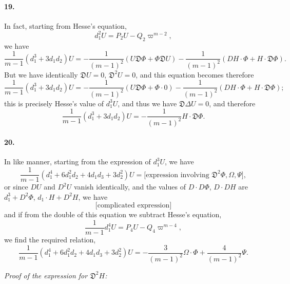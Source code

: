 \documentclass[12pt,a4paper]{article}
\theoremstyle{plain}
\begin{document}
\paragraph{19.}
In  fact,  starting  from  Hesse's  equation,
\[
d_1^2 U = P_2 U - Q_2 \varpi^{m-2},
\]
we   have
\[
\frac{1}{m-1}(d_1^3 + 3d_1 d_2)U = -\frac{1}{(m-1)^2}(U \mathfrak{D} \Phi + \Phi \mathfrak{D} U) - \frac{1}{(m-1)^2}(DH \cdot \Phi + H \cdot \mathfrak{D} \Phi).
\]
But  we  have  identically  $\mathfrak{D} U = 0$,  $\mathfrak{D}^2 U = 0$,  and  this  equation  becomes  therefore
\[
\frac{1}{m-1}(d_1^3 + 3d_1 d_2)U = -\frac{1}{(m-1)^2}(U \mathfrak{D} \Phi + \Phi \cdot 0) - \frac{1}{(m-1)^2}(DH \cdot \Phi + H \cdot \mathfrak{D} \Phi);
\]
this  is  precisely  Hesse's  value  of  $d_1^3 U$,  and  thus  we  have  $\mathfrak{D} \Delta U = 0$,  and  therefore
\[
\frac{1}{m-1}(d_1^3 + 3d_1 d_2)U = -\frac{1}{(m-1)^2} H \cdot \mathfrak{D} \Phi.
\]

\paragraph{20.}
In  like  manner,  starting  from  the  expression  of  $d_1^3 U$,  we  have
\[
\frac{1}{m-1}(d_1^4 + 6d_1^2 d_2 + 4d_1 d_3 + 3d_2^2)U = \text{[expression involving  } \mathfrak{D}^2 \Phi, \Omega, \Psi\text{]},
\]
or    since    $DU$    and    $D^2 U$    vanish    identically,    and    the    values    of    $D \cdot D\Phi$,    $D \cdot DH$    are
$d_1^3 + D^2 \Phi$,  $d_1 \cdot H + D^2 H$,  we  have
\[
\text{[complicated  expression]}
\]
and  if  from  the  double  of  this  equation  we  subtract  Hesse's  equation,
\[
\frac{1}{m-1} d_1^4 U = P_4 U - Q_4 \varpi^{m-4},
\]
we  find  the  required  relation,
\[
\frac{1}{m-1}(d_1^4 + 6d_1^2 d_2 + 4d_1 d_3 + 3d_2^2)U = -\frac{3}{(m-1)^2} \Omega \cdot \Phi + \frac{4}{(m-1)^2} \Psi.
\]

\newpage

\noindent\textit{Proof of the expression for $\mathfrak{D}^2 H$:}
\end{document}
